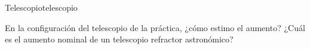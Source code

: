 \begin{problem}{Telescopio}{telescopio}

En la configuración del telescopio de la práctica, ¿cómo estimo el aumento? ¿Cuál es el aumento nominal de un telescopio refractor astronómico?

\end{problem}